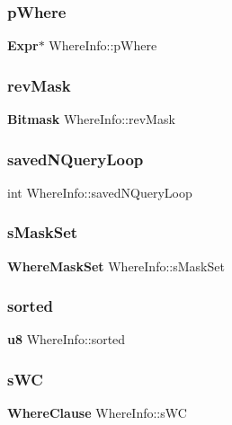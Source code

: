 \mbox{\label{struct_where_info_afae86f54ed8f79536437d1e71e348133}} 
\subsubsection{pWhere}
{\footnotesize\ttfamily \textbf{ Expr}$\ast$ Where\+Info\+::p\+Where}

\mbox{\label{struct_where_info_abff60764e39a62d7ede2a5d8f1ce4fff}} 
\subsubsection{revMask}
{\footnotesize\ttfamily \textbf{ Bitmask} Where\+Info\+::rev\+Mask}

\mbox{\label{struct_where_info_afbe6acca6a5a64d4b780a85a96ec320e}} 
\subsubsection{savedNQueryLoop}
{\footnotesize\ttfamily int Where\+Info\+::saved\+N\+Query\+Loop}

\mbox{\label{struct_where_info_ae51ef2af01420b9370a844ee32cc5fc5}} 
\subsubsection{sMaskSet}
{\footnotesize\ttfamily \textbf{ Where\+Mask\+Set} Where\+Info\+::s\+Mask\+Set}

\mbox{\label{struct_where_info_a3af366c002fdf9cb36459ab5e4979232}} 
\subsubsection{sorted}
{\footnotesize\ttfamily \textbf{ u8} Where\+Info\+::sorted}

\mbox{\label{struct_where_info_ab5690a0fa9f78c25a79dd9e50d747fdf}} 
\subsubsection{sWC}
{\footnotesize\ttfamily \textbf{ Where\+Clause} Where\+Info\+::s\+WC}

